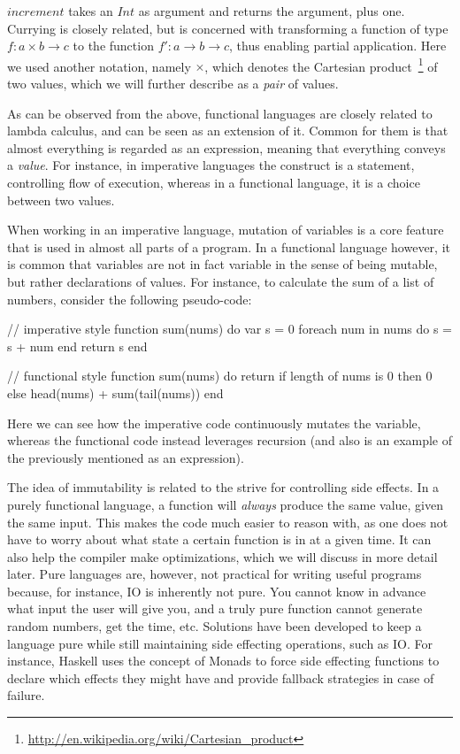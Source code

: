 $increment$ takes an $Int$ as argument and returns the argument, plus one. Currying is closely related, but is concerned with transforming a function of type $f : a \times b \to c$ to the function $f' : a \to b \to c$, thus enabling partial application. Here we used another notation, namely $\times$, which denotes the Cartesian product~\footnote{\url{http://en.wikipedia.org/wiki/Cartesian_product}} of two values, which we will further describe as a \emph{pair} of values.

As can be observed from the above, functional languages are closely related to lambda calculus, and can be seen as an extension of it. Common for them is that almost everything is regarded as an expression, meaning that everything conveys a \emph{value}. For instance, in imperative languages the  construct is a statement, controlling flow of execution, whereas in a functional language, it is a choice between two values.

When working in an imperative language, mutation of variables is a core feature that is used in almost all parts of a program. In a functional language however, it is common that variables are not in fact variable in the sense of being mutable, but rather declarations of values. For instance, to calculate the sum of a list of numbers, consider the following pseudo-code:

\begin{pseudo}
// imperative style
function sum(nums) do
  var s = 0
  foreach num in nums do
    s = s + num
  end
  return s
end

// functional style
function sum(nums) do
  return if length of nums is 0
    then 0
    else head(nums) + sum(tail(nums))
end
\end{pseudo}

Here we can see how the imperative code continuously mutates the  variable, whereas the functional code instead leverages recursion (and also is an example of the previously mentioned  as an expression).

The idea of immutability is related to the strive for controlling side effects. In a purely functional language, a function will \emph{always} produce the same value, given the same input. This makes the code much easier to reason with, as one does not have to worry about what state a certain function is in at a given time. It can also help the compiler make optimizations, which we will discuss in more detail later. Pure languages are, however, not practical for writing useful programs because, for instance, IO is inherently not pure. You cannot know in advance what input the user will give you, and a truly pure function cannot generate random numbers, get the time, etc. Solutions have been developed to keep a language pure while still maintaining side effecting operations, such as IO. For instance, Haskell uses the concept of Monads to force side effecting functions to declare which effects they might have and provide fallback strategies in case of failure.


